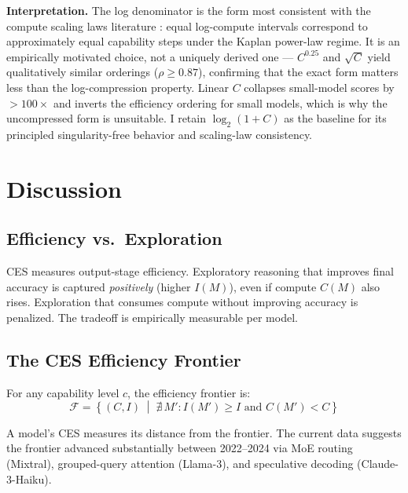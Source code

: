 \documentclass[12pt]{article}
\begin{document}
\textbf{Interpretation.} The log denominator is the form most consistent with the compute scaling laws literature \cite{kaplan2020}: equal log-compute intervals correspond to approximately equal capability steps under the Kaplan power-law regime. It is an empirically motivated choice, not a uniquely derived one --- $C^{0.25}$ and $\sqrt{C}$ yield qualitatively similar orderings ($\rho \geq 0.87$), confirming that the exact form matters less than the log-compression property. Linear $C$ collapses small-model scores by $>100\times$ and inverts the efficiency ordering for small models, which is why the uncompressed form is unsuitable. I retain $\log_2(1+C)$ as the baseline for its principled singularity-free behavior and scaling-law consistency.

\appendix

\section{Discussion}

\subsection{Efficiency vs.\ Exploration}

CES measures output-stage efficiency. Exploratory reasoning that improves final accuracy is captured \textit{positively} (higher $I(M)$), even if compute $C(M)$ also rises. Exploration that consumes compute without improving accuracy is penalized. The tradeoff is empirically measurable per model.

\subsection{The CES Efficiency Frontier}

For any capability level $c$, the efficiency frontier is:
\begin{equation}
\mathcal{F} = \left\{(C, I) \;\middle|\; \nexists\, M': I(M') \geq I \text{ and } C(M') < C\right\}
\end{equation}

A model's CES measures its distance from the frontier. The current data suggests the frontier advanced substantially between 2022--2024 via MoE routing (Mixtral), grouped-query attention (Llama-3), and speculative decoding (Claude-3-Haiku).
\end{document}
